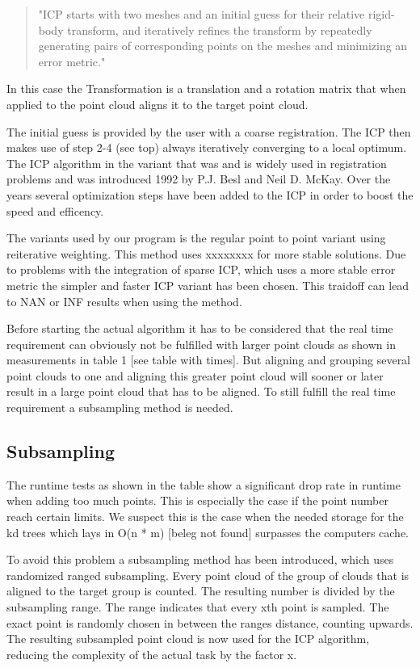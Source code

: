 \documentclass[hyperref,english,bachelorofscience,bibnum]{cgvpub}
\begin{document}
\begin{quote}
"ICP starts with two meshes and an initial guess for their relative rigid-body transform, and iteratively refines the transform by repeatedly generating pairs of corresponding points on the meshes and minimizing an error metric."\cite{Rusinkiewicza}
\end{quote}
In this case the Transformation is a translation and a rotation matrix that when applied to the point cloud aligns it to the target point cloud.

The initial guess is provided by the user with a coarse registration. The ICP then makes use of step 2-4 (see top) always iteratively converging to a local optimum.\cite{Besl92}
The ICP algorithm in the variant that was and is widely used in registration problems and was introduced 1992 by P.J. Besl and Neil D. McKay\cite{Besl92}. Over the years several optimization steps have been added to the ICP in order to boost the speed and efficency.

The variants used by our program is the regular point to point variant using reiterative weighting.
This method uses xxxxxxxx for more stable solutions. Due to problems with the integration of sparse ICP, which uses a more stable error metric the simpler and faster ICP variant has been chosen. This traidoff can lead to NAN or INF results when using the method.
 
Before starting the actual algorithm it has to be considered that the real time requirement can obviously not be fulfilled with larger point clouds as shown in measurements in table 1 [see table with times]. But aligning and grouping several point clouds to one and aligning this greater point cloud will sooner or later result in a large point cloud that has to be aligned. To still fulfill the real time requirement a subsampling method is needed.

\subsection{Subsampling}

The runtime tests as shown in the table show a significant drop rate in runtime when adding too much points. This is especially the case if the point number reach certain limits. We suspect this is the case when the needed storage for the kd trees which lays in O(n * m) [beleg not found] surpasses the computers cache.

To avoid this problem a subsampling method has been introduced, which uses randomized ranged subsampling. Every point cloud of the group of clouds that is aligned to the target group is counted. The resulting number is divided by the subsampling range. The range indicates that every xth point is sampled. The exact point is randomly chosen in between the ranges distance, counting upwards. The resulting subsampled point cloud is now used for the ICP algorithm, reducing the complexity of the actual task by the factor x.
\end{document}
